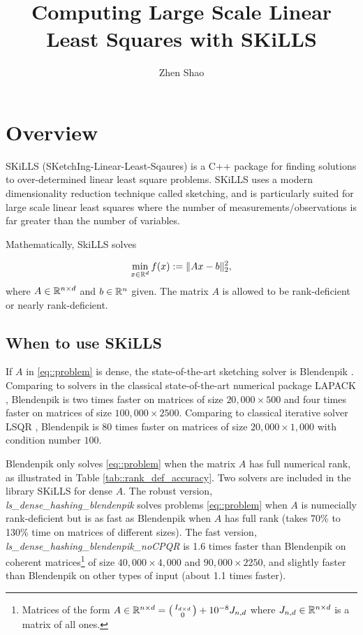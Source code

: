 \documentclass[english,11pt]{article}
\begin{document}
\title{Computing Large Scale Linear Least Squares with SKiLLS}

\author{Zhen Shao}\maketitle

\section{Overview}

SKiLLS (SKetchIng-Linear-Least-Sqaures) is a C++ package for finding solutions to over-determined linear least square problems. SKiLLS uses a modern dimensionality reduction technique called sketching, and is particularly suited for large scale linear least squares where the number of measurements/observations is far greater than the number of variables. 

Mathematically, SkiLLS solves

\begin{align}
\min_{x \in \mathbb{R}^{d}} f(x): = \|Ax - b\|_2^2, \label{eq::problem}
\end{align}
where $A \in \mathbb{R}^{n\times d}$ and $b \in \mathbb{R}^{n}$ given. The matrix $A$ is allowed to be rank-deficient or nearly rank-deficient. 

\subsection{When to use SKiLLS}

If $A$ in \eqref{eq::problem} is dense, the state-of-the-art sketching solver is Blendenpik \cite{doi:10.1137/090767911}. Comparing to solvers in the classical state-of-the-art numerical package LAPACK \cite{laug}, Blendenpik is two times faster on matrices of size $20,000 \times 500$ and four times faster on matrices of size $100,000 \times 2500$. Comparing to classical iterative solver LSQR \cite{Paige:1982aa}, Blendenpik is 80 times faster on matrices of size $20,000 \times 1,000$ with condition number $100$. 

Blendenpik only solves \eqref{eq::problem} when the matrix $A$ has full numerical rank, as illustrated in Table \ref{tab::rank_def_accuracy}. Two solvers are included in the library SKiLLS for dense $A$. The robust version, \\{\it{ls_dense_hashing_blendenpik} }solves problems \ref{eq::problem} when $A$ is numecially rank-deficient but is as fast as Blendenpik when $A$ has full rank (takes 70\% to 130\% time on matrices of different sizes). The fast version, {\it{ls_dense_hashing_blendenpik_noCPQR}} is 1.6 times faster than Blendenpik on coherent matrices\footnote{Matrices of the form $A \in \mathbb{R}^{n\times d} = \bigl(\begin{smallmatrix} I_{d\times d} \\ 0  \end{smallmatrix}\bigr) + 10^{-8}J_{n,d} $ where $J_{n,d} \in \mathbb{R}^{n \times d}$ is a matrix of all ones.} of size $40,000 \times 4,000$ and $90,000 \times 2250$, and slightly faster than Blendenpik on other types of input (about 1.1 times faster).
\end{document}
